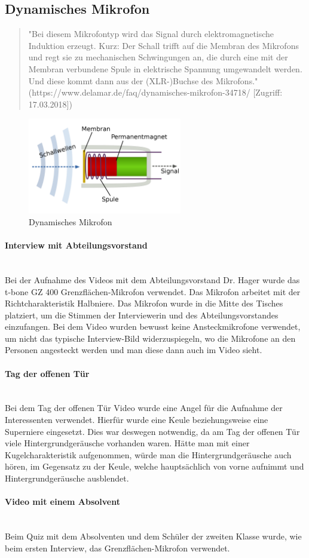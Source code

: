 \subsection{Dynamisches Mikrofon}
\begin{quote}
"Bei diesem Mikrofontyp wird das Signal durch elektromagnetische Induktion erzeugt. Kurz: Der Schall trifft auf die Membran des Mikrofons und regt sie zu mechanischen Schwingungen an, die durch eine mit der Membran verbundene Spule in elektrische Spannung umgewandelt werden. Und diese kommt dann aus der (XLR-)Buchse des Mikrofons." (https://www.delamar.de/faq/dynamisches-mikrofon-34718/ [Zugriff: 17.03.2018])
\end{quote} 
\begin{figure}[H]
	\centering
	\includegraphics[width=0.6\textwidth]{abb9} 
	\caption[Dynamisches Mikrofon]{Dynamisches Mikrofon\footnotemark}
\end{figure}
\paragraph{Interview mit Abteilungsvorstand}
\leavevmode \\
Bei der Aufnahme des Videos mit dem Abteilungsvorstand Dr. Hager wurde das t-bone GZ 400 Grenzflächen-Mikrofon verwendet. Das Mikrofon arbeitet mit der Richtcharakteristik Halbniere. Das Mikrofon wurde in die Mitte des Tisches platziert, um die Stimmen der Interviewerin und des Abteilungsvorstandes einzufangen.\newline
Bei dem Video wurden bewusst keine Ansteckmikrofone verwendet, um nicht das typische Interview-Bild widerzuspiegeln, wo die Mikrofone an den Personen angesteckt werden und man diese dann auch im Video sieht.
\paragraph{Tag der offenen Tür}
\leavevmode \\
Bei dem Tag der offenen Tür Video wurde eine Angel für die Aufnahme der Interessenten verwendet. Hierfür wurde eine Keule beziehungsweise eine Superniere eingesetzt. Dies war deswegen notwendig, da am Tag der offenen Tür viele Hintergrundgeräusche vorhanden waren. Hätte man mit einer Kugelcharakteristik aufgenommen, würde man die Hintergrundgeräusche auch hören, im Gegensatz zu der Keule, welche hauptsächlich von vorne aufnimmt und Hintergrundgeräusche ausblendet.
\paragraph{Video mit einem Absolvent}
\leavevmode \\
Beim Quiz mit dem Absolventen und dem Schüler der zweiten Klasse wurde, wie beim ersten Interview, das Grenzflächen-Mikrofon verwendet.
